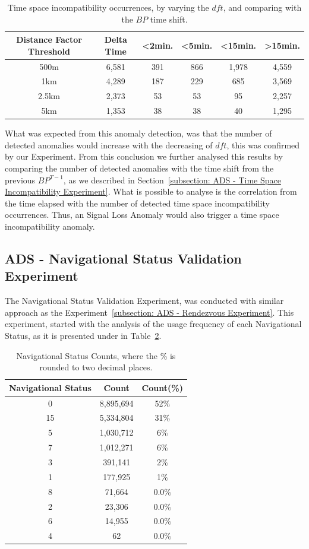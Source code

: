 \begin{table}[H]
\centering
\caption{Time space incompatibility occurrences, by varying the $dft$, and comparing with the $BP$ time shift.}
\label{Table: 5 Time Space}
\begin{tabular}{@{}cccccc@{}}
\toprule
Distance Factor Threshold & Delta Time & \textless{}2min. & \textless{}5min. & \textless{}15min. & \textgreater{}15min. \\ \midrule
500m & 6,581 & 391 & 866 & 1,978 & 4,559 \\
1km & 4,289 & 187 & 229 & 685 & 3,569 \\
2.5km & 2,373 & 53 & 53 & 95 & 2,257 \\
5km & 1,353 & 38 & 38 & 40 & 1,295 \\ \bottomrule
\end{tabular}
\end{table}

What was expected from this anomaly detection, was that the number of detected anomalies would increase with the decreasing of $dft$, this was confirmed by our Experiment. From this conclusion we further analysed this results by comparing the number of detected anomalies with the time shift from the previous $BP^{T-1}$, as we described in Section~\ref{subsection: ADS - Time Space Incompatibility Experiment}.
What is possible to analyse is the correlation from the time elapsed with the number of detected time space incompatibility occurrences. Thus, an Signal Loss Anomaly would also trigger a time space incompatibility anomaly.


\subsection{ADS - Navigational Status Validation Experiment}
\label{subsection: ADS - Navigational Status Experiment}
The Navigational Status Validation Experiment, was conducted with similar approach as the Experiment~\ref{subsection: ADS - Rendezvous Experiment}.
This experiment, started with the analysis of the usage frequency of each Navigational Status, as it is presented under in Table~\ref{Table: 5 Status Counts}.
\begin{table}[H]
\centering
\caption{Navigational Status Counts, where the \% is rounded to two decimal places.}
\label{Table: 5 Status Counts}
\begin{tabular}{@{}ccc@{}}
\toprule
Navigational Status & Count & Count(\%) \\ \midrule
0 & 8,895,694 & 52\% \\
15 & 5,334,804 & 31\% \\
5 & 1,030,712 & 6\% \\
7 & 1,012,271 & 6\% \\
3 & 391,141 & 2\% \\
1 & 177,925 & 1\% \\
8 & 71,664 & 0.0\% \\
2 & 23,306 & 0.0\% \\
6 & 14,955 & 0.0\% \\
4 & 62 & 0.0\% \\ \bottomrule
\end{tabular}
\end{table}

